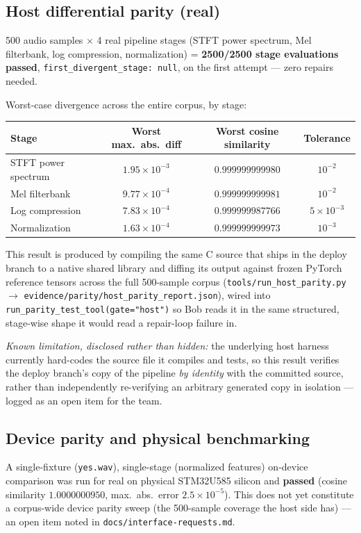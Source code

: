 \documentclass[11pt,a4paper]{article}
\begin{document}
\subsection{Host differential parity (real)}
\begin{infobox}
500 audio samples $\times$ 4 real pipeline stages (STFT power spectrum,
Mel filterbank, log compression, normalization) = \textbf{2500/2500 stage
evaluations passed}, \texttt{first\_divergent\_stage: null}, on the first
attempt --- zero repairs needed.
\end{infobox}
Worst-case divergence across the entire corpus, by stage:
\begin{center}
\begin{tabular}{@{}lccc@{}}
\toprule
\textbf{Stage} & \textbf{Worst max.\ abs.\ diff} & \textbf{Worst cosine similarity} & \textbf{Tolerance} \\
\midrule
STFT power spectrum & $1.95\times10^{-3}$ & $0.999999999980$ & $10^{-2}$ \\
Mel filterbank & $9.77\times10^{-4}$ & $0.999999999981$ & $10^{-2}$ \\
Log compression & $7.83\times10^{-4}$ & $0.999999987766$ & $5\times10^{-3}$ \\
Normalization & $1.63\times10^{-4}$ & $0.999999999973$ & $10^{-3}$ \\
\bottomrule
\end{tabular}
\end{center}
This result is produced by compiling the same C source that ships in the
deploy branch to a native shared library and diffing its output against
frozen PyTorch reference tensors across the full 500-sample corpus
(\texttt{tools/run\_host\_parity.py} $\to$ \texttt{evidence/parity/host\_parity\_report.json}),
wired into \texttt{run\_parity\_test\_tool(gate="host")} so Bob reads it in
the same structured, stage-wise shape it would read a repair-loop failure
in.

\emph{Known limitation, disclosed rather than hidden:} the underlying host
harness currently hard-codes the source file it compiles and tests, so
this result verifies the deploy branch's copy of the pipeline \emph{by
identity} with the committed source, rather than independently
re-verifying an arbitrary generated copy in isolation --- logged as an open
item for the team.

\subsection{Device parity and physical benchmarking}
\label{sec:device-benchmark}
A single-fixture (\texttt{yes.wav}), single-stage (normalized features)
on-device comparison was run for real on physical STM32U585 silicon and
\textbf{passed} (cosine similarity $1.0000000950$, max.\ abs.\ error
$2.5\times10^{-5}$). This does not yet constitute a corpus-wide device
parity sweep (the 500-sample coverage the host side has) --- an open item
noted in \texttt{docs/interface-requests.md}.
\end{document}
